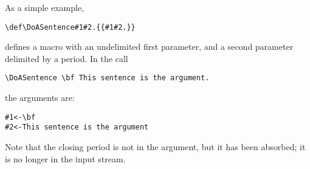 As a simple example,
\begin{verbatim}
\def\DoASentence#1#2.{{#1#2.}}
\end{verbatim}
defines a macro with an undelimited first parameter,
and a second parameter delimited by a period.
In the call
\begin{verbatim}
\DoASentence \bf This sentence is the argument.
\end{verbatim}
the arguments are:
\begin{verbatim}
#1<-\bf
#2<-This sentence is the argument
\end{verbatim}
Note that the closing period is not in the argument, but it has
been absorbed; it is no longer in the input stream.



